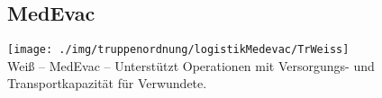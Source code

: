 \subsection{MedEvac}
\texttt{[image: ./img/truppenordnung/logistikMedevac/TrWeiss]}\\
Weiß -- \acf{MedEvac} -- Unterstützt Operationen mit Versorgungs- und Transportkapazität für Verwundete.